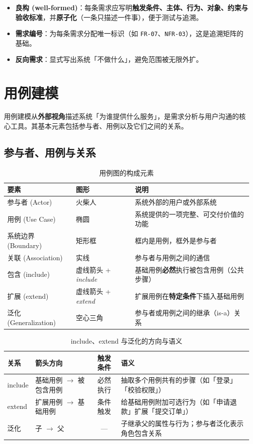 \begin{itemize}
    \item \textbf{良构 (well-formed)}：每条需求应写明\textbf{触发条件、主体、行为、对象、约束与验收标准}，并\textbf{原子化}（一条只描述一件事），便于测试与追溯。
    \item \textbf{需求编号}：为每条需求分配唯一标识（如 \texttt{FR-07}、\texttt{NFR-03}），这是追溯矩阵的基础。
    \item \textbf{反向需求}：显式写出系统「不做什么」，避免范围被无限外扩。
\end{itemize}

\section{用例建模}

用例建模从\textbf{外部视角}描述系统「为谁提供什么服务」，是需求分析与用户沟通的核心工具。其基本元素包括参与者、用例以及它们之间的关系。

\subsection{参与者、用例与关系}

\begin{table}[H]
\centering
\caption{用例图的构成元素}
\begin{tabulary}{\textwidth}{LLL}
\toprule
要素 & 图形 & 说明 \\
\midrule
参与者 (Actor) & 火柴人 & 系统外部的用户或外部系统 \\
用例 (Use Case) & 椭圆 & 系统提供的一项完整、可交付价值的功能 \\
系统边界 (Boundary) & 矩形框 & 框内是用例，框外是参与者 \\
关联 (Association) & 实线 & 参与者与用例之间的通信 \\
包含 (include) & 虚线箭头 + \textit{include} & 基础用例\textbf{必然}执行被包含用例（公共步骤） \\
扩展 (extend) & 虚线箭头 + \textit{extend} & 扩展用例在\textbf{特定条件}下插入基础用例 \\
泛化 (Generalization) & 空心三角 & 参与者或用例之间的继承（is-a）关系 \\
\bottomrule
\end{tabulary}
\end{table}

\begin{table}[H]
\centering
\caption{include、extend 与泛化的方向与语义}
\begin{tabulary}{\textwidth}{LLCL}
\toprule
关系 & 箭头方向 & 触发条件 & 语义 \\
\midrule
include & 基础用例 $\to$ 被包含用例 & 必然执行 & 抽取多个用例共有的步骤（如「登录」「校验权限」） \\
extend & 扩展用例 $\to$ 基础用例 & 条件触发 & 给基础用例附加可选行为（如「申请退款」扩展「提交订单」） \\
泛化 & 子 $\to$ 父 & --- & 子继承父的属性与行为；参与者泛化表示角色包含关系 \\
\bottomrule
\end{tabulary}
\end{table}

